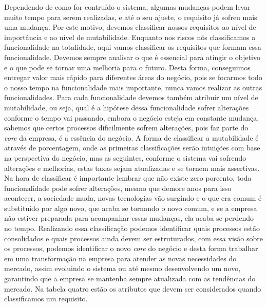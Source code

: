         Dependendo de como for contruído o sistema, algumas mudanças podem levar
        muito tempo para serem realizadas, e até o seu ajuste, o requisito já sofreu
        mais uma mudança. Por este motivo, devemos classificar nossos requisitos
        ao nível de importância e ao nível de mutabilidade. Enquanto nos riscos
        nós classificamos a funcionalidade na totalidade, aqui vamos classificar
        os requisitos que formam essa funcionalidade. Devemos sempre analisar o que
        é essencial para atingir o objetivo e o que pode se tornar uma melhoria para
        o futuro. Desta forma, conseguimos entregar valor mais rápido para diferentes
        áreas do negócio, pois se focarmos todo o nosso tempo na funcionalidade
        mais importante, nunca vamos realizar as outras funcionalidades. Para cada
        funcionalidade devemos também atribuir um nível de mutabilidade, ou seja,
        qual é a hipótese dessa funcionalidade sofrer alterações conforme o tempo
        vai passando, embora o negócio esteja em constante mudança, sabemos que
        certos processos dificilmente sofrem alterações, pois faz parte do \textit{core}
        da empresa, é a essência do negócio. A forma de classificar a mutabilidade
        é através de porcentagem, onde as primeiras classificações serão intuições
        com base na perspectiva do negócio, mas as seguintes, conforme o sistema
        vai sofrendo alterações e melhorias, estas taxas sejam atualizadas e se
        tornem mais assertivas. Na hora de classificar é importante lembrar que
        não existe zero porcento, toda funcionalidade pode sofrer alterações,
        mesmo que demore anos para isso acontecer, a sociedade muda, novas
        tecnologias vão surgindo e o que era comum é substituído por algo novo,
        que acaba se tornando o novo comum, e se a empresa não estiver preparada
        para acompanhar essas mudanças, ela acaba se perdendo no tempo. Realizando
        essa classificação podemos identificar quais processos estão consolidados
        e quais processos ainda devem ser estruturados, com essa visão sobre os
        processos, podemos identificar o novo \textit{core} do negócio e desta
        forma trabalhar em uma transformação na empresa para atender as novas
        necessidades do mercado, assim evoluindo o sistema ou até mesmo desenvolvendo
        um novo, garantindo que a empresa se mantenha sempre atualizada com as
        tendências do mercado. Na tabela quatro estão os atributos que devem ser
        considerados quando classificamos um requisito. \newline

